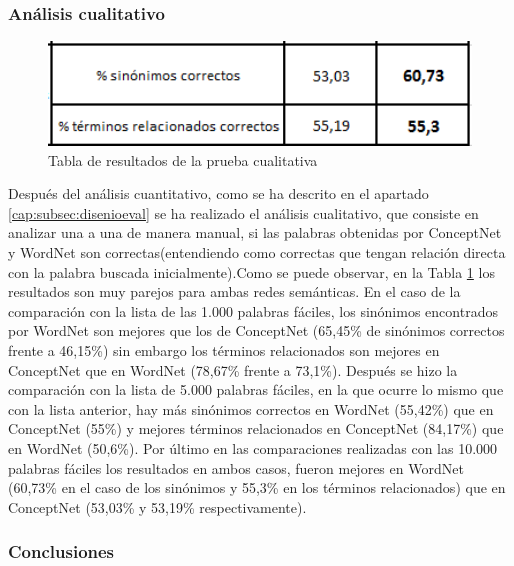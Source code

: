 \subsubsection{Análisis cualitativo}
\label{sssec:pruebaCualitativa}

\begin{figure}[!h]
	\includegraphics[width=1.0\textwidth]{Imagenes/Bitmap/Capitulo4/tabla_cualitativa}
	\caption{Tabla de resultados de la prueba cualitativa}
	\label{fig:tabla_cualitativa}
\end{figure}

Después del análisis cuantitativo, como se ha descrito en el apartado \ref{cap:subsec:disenioeval} se ha realizado el análisis cualitativo, que consiste en analizar una a una de manera manual, si las palabras obtenidas por ConceptNet y WordNet son correctas(entendiendo como correctas que tengan relación directa con la palabra buscada inicialmente).Como se puede observar, en la Tabla \ref{fig:tabla_cualitativa} los resultados son muy parejos para ambas redes semánticas. En el caso de la comparación con la lista de las 1.000 palabras fáciles, los sinónimos encontrados por WordNet son mejores que los de ConceptNet (65,45\% de sinónimos correctos frente a 46,15\%) sin embargo los términos relacionados son mejores en ConceptNet que en WordNet (78,67\% frente a 73,1\%). Después se hizo la comparación con la lista de 5.000 palabras fáciles, en la que ocurre lo mismo que con la lista anterior, hay más sinónimos correctos en WordNet (55,42\%) que en ConceptNet (55\%) y mejores términos relacionados en ConceptNet (84,17\%) que en WordNet (50,6\%). Por último en las comparaciones realizadas con las 10.000 palabras fáciles los resultados en ambos casos, fueron mejores en WordNet (60,73\% en el caso de los sinónimos y 55,3\% en los términos relacionados) que en ConceptNet (53,03\% y 53,19\% respectivamente).


\subsubsection{Conclusiones}
\label{sssec:conclusionPruebas}

